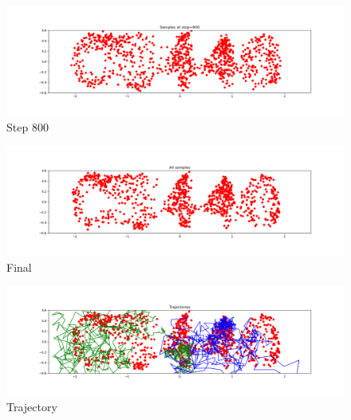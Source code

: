 \documentclass[12pt]{article}
\begin{document}
\begin{figure}[H]
    \centering
    \includegraphics[width=\linewidth]{codes/imgs/diffusion/step800.png}
    \caption{Step 800}
    \label{fig:step800}
\end{figure}

\begin{figure}[H]
    \centering
    \includegraphics[width=\linewidth]{codes/imgs/diffusion/all.png}
    \caption{Final}
    \label{fig:step1000}
\end{figure}

\begin{figure}[H]
    \centering
    \includegraphics[width=\linewidth]{codes/imgs/diffusion/trajectory.png}
    \caption{Trajectory}
\end{figure}
\end{document}
